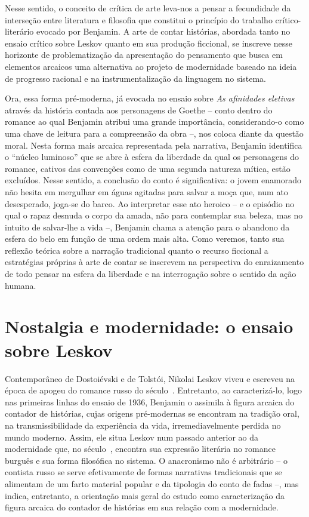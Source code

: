 Nesse sentido, o conceito de crítica de arte leva-nos a pensar a
fecundidade da interseção entre literatura e filosofia que constitui o
princípio do trabalho crítico-literário evocado por Benjamin. A arte de
contar histórias, abordada tanto no ensaio crítico sobre Leskov quanto
em sua produção ficcional, se inscreve nesse horizonte de
problematização da apresentação do pensamento que busca em elementos
arcaicos uma alternativa ao projeto de modernidade baseado na ideia de
progresso racional e na instrumentalização da linguagem no sistema.

Ora, essa forma pré-moderna, já evocada no ensaio sobre \emph{As
afinidades eletivas} através da história contada aos personagens de
Goethe -- conto dentro do romance ao qual Benjamin atribui uma grande
importância, considerando-o como uma chave de leitura para a compreensão
da obra --, nos coloca diante da questão moral. Nesta forma mais arcaica
representada pela narrativa, Benjamin identifica o ``núcleo luminoso''
que se abre à esfera da liberdade da qual os personagens do romance,
cativos das convenções como de uma segunda natureza mítica, estão
excluídos. Nesse sentido, a conclusão do conto é significativa: o jovem
enamorado não hesita em mergulhar em águas agitadas para salvar a moça
que, num ato desesperado, joga-se do barco. Ao interpretar esse ato
heroico -- e o episódio no qual o rapaz desnuda o corpo da amada, não
para contemplar sua beleza, mas no intuito de salvar-lhe a vida --,
Benjamin chama a atenção para o abandono da esfera do belo em função de
uma ordem mais alta. Como veremos, tanto sua reflexão teórica sobre a
narração tradicional quanto o recurso ficcional a estratégias próprias à
arte de contar se inscrevem na perspectiva do enraizamento de todo pensar
na esfera da liberdade e na interrogação sobre o sentido da ação humana.

\section{Nostalgia e modernidade: o ensaio sobre Leskov}

Contemporâneo de Dostoiévski e de Tolstói, Nikolai Leskov viveu e
escreveu na época de apogeu do romance russo do século~. Entretanto,
ao caracterizá-lo, logo nas primeiras linhas do ensaio de 1936, Benjamin
o assimila à figura arcaica do contador de histórias, cujas origens
pré-modernas se encontram na tradição oral, na transmissibilidade da
experiência da vida, irremediavelmente perdida no mundo moderno. Assim,
ele situa Leskov num passado anterior ao da modernidade que, no século~, 
encontra sua expressão literária no romance burguês e sua forma
filosófica no sistema. O anacronismo não é arbitrário -- o contista
russo se serve efetivamente de formas narrativas tradicionais que se
alimentam de um farto material popular e da tipologia do conto de fadas
--, mas indica, entretanto, a orientação mais geral do estudo como
caracterização da figura arcaica do contador de histórias em sua relação
com a modernidade.

